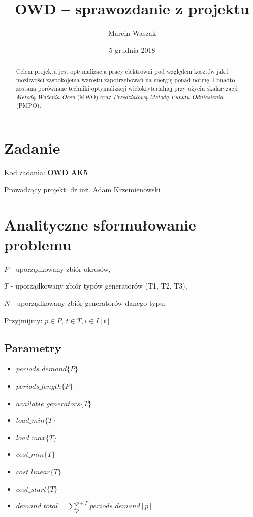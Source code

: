 \documentclass[12pt, twoside, hidelinks, a4paper]{article}
\begin{document}

\author{Marcin Waszak}
\title{OWD -- sprawozdanie z projektu}
\date{5 grudnia 2018}


\maketitle

\begin{abstract}
Celem projektu jest optymalizacja pracy elektrowni pod względem kosztów jak i możliwości zaspokojenia wzrostu zapotrzebowań na energię ponad normę. Ponadto zostaną porównane techniki optymalizacji wielokryterialnej przy użyciu skalaryzacji \textit{Metodą Ważenia Ocen} (MWO) oraz \textit{Przedziałową Metodą Punktu Odniesienia} (PMPO).
\end{abstract}

\section{Zadanie}
Kod zadania: \textbf{OWD AK5}

Prowadzący projekt: dr inż. Adam Krzemienowski

\section{Analityczne sformułowanie problemu}
$P$ - uporządkowany zbiór okresów,

$T$ - uporządkowany zbiór typów generatorów (T1, T2, T3),

$N$ - uporządkowany zbiór generatorów danego typu,

Przyjmijmy: $p \in P$, $t \in T, i \in I[t]$

\subsection{Parametry}
\begin{itemize}
\item $periods\_demand \{P\}$
\item $periods\_length \{P\}$
\item $available\_generators \{T\}$
\item $load\_min \{T\}$
\item $load\_max \{T\}$
\item $cost\_min \{T\}$
\item $cost\_linear \{T\}$
\item $cost\_start \{T\}$
\item $demand\_total = \sum_{p}^{p \in P} periods\_demand[p]$
\end{itemize}
\end{document}
